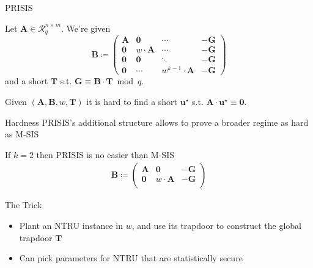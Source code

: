 \documentclass[xcolor=table,10pt,aspectratio=169]{beamer}
\renewcommand{\vec}[1]{\ensuremath{\mathbf{#1}}\xspace}
\providecommand{\mat}[1]{\ensuremath{\vec{#1}}\xspace}
\providecommand{\ring}[0]{\ensuremath{\mathcal{R}}\xspace}
\begin{document}
\begin{frame}[label={sec:org6861ad2}]{PRISIS}
\begin{definition}[PRISIS]
Let \(\mat{A} \in \ring_{q}^{n \times m}\). We're given
\[\vec{B} \coloneqq \begin{pmatrix}
\mat{A} &               \vec{0} & \cdots & - \vec{G}\\
\vec{0} &           w \cdot \mat{A} & \cdots & -\vec{G}\\
\mat{0} &               \vec{0} & \ddots & -\vec{G}\\
\vec{0} & \cdots & w^{k-1} \cdot \mat{A} & -\vec{G}
\end{pmatrix}\] and a short \(\vec{T}\) s.t. \(\vec{G} \equiv \vec{B} \cdot \vec{T} \bmod q.\)

Given \((\mat{A}, \mat{B}, w, \vec{T})\) it is hard to find a short \(\vec{u}^{\star}\) s.t. \(\mat{A} \cdot \vec{u}^{\star} \equiv \vec{0}\).
\end{definition}

{\footnotesize {} \par}
\end{frame}

\begin{frame}[label={sec:org89d6008}]{Hardness}
PRISIS's additional structure allows to prove a broader regime as hard as M-SIS

\begin{alertblock}{If \(k=2\) then PRISIS is no easier than M-SIS}
\begin{align*}
\vec{B} \coloneqq  \begin{pmatrix}
\mat{A} &               \vec{0} & -\vec{G}\\
\vec{0} &           w \cdot \mat{A} & -\vec{G}\\
\end{pmatrix}
\end{align*}
\end{alertblock}

\begin{block}{The Trick}
\begin{itemize}
\item Plant an NTRU instance in \(w\), and use its trapdoor to construct the global trapdoor \(\mat{T}\)
\item Can pick parameters for NTRU that are statistically secure
\end{itemize}
\end{block}
\end{frame}
\end{document}
